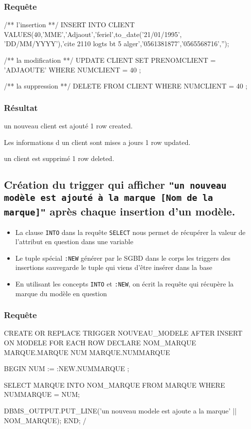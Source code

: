 \documentclass[•]{article}
\begin{document}
\subsubsection{Requête}
\begin{sql}
/** l'insertion **/
INSERT INTO CLIENT 
VALUES(40,'MME','Adjaout','feriel',to_date('21/01/1995', 'DD/MM/YYYY'),'cite 2110 logts bt 5 alger','0561381877','0565568716','');

/** la modification **/
UPDATE CLIENT 
SET PRENOMCLIENT = 'ADJAOUTE' 
WHERE NUMCLIENT = 40 ;

/** la suppression **/
DELETE FROM CLIENT 
WHERE NUMCLIENT = 40 ;

\end{sql}
\subsubsection{Résultat}
\begin{sql}
un nouveau client est ajouté
1 row created.

Les informations d un client sont mises a jours
1 row updated.

un client est supprimé
1 row deleted.
\end{sql}

\subsection{Création du trigger qui afficher \texttt{"un nouveau modèle est ajouté à la marque [Nom de la marque]"}
après chaque insertion d'un modèle.}

\begin{itemize}
\item
La clause \texttt{INTO} dans la requête \texttt{SELECT} nous permet de récupérer la 
valeur de l'attribut en question dans une variable
\item
Le tuple spécial \texttt{:NEW} générer par le SGBD dans le corps les triggers des insertions 
sauvegarde le tuple qui viens d'être insérer dans la base
\item
En utilisant les concepts \texttt{INTO} et \texttt{:NEW}, on écrit la requête qui récupère la marque du modèle en question
\end{itemize}


\subsubsection{Requête}
\begin{sql}
CREATE OR REPLACE TRIGGER NOUVEAU_MODELE
AFTER INSERT ON MODELE
FOR EACH ROW
DECLARE 
NOM_MARQUE MARQUE.MARQUE%
NUM MARQUE.NUMMARQUE%

BEGIN
    NUM := :NEW.NUMMARQUE ;

	SELECT MARQUE INTO NOM_MARQUE
	FROM MARQUE WHERE NUMMARQUE = NUM;


	DBMS_OUTPUT.PUT_LINE('un nouveau modele est ajoute a la marque' || NOM_MARQUE);
END;
/
\end{sql}
\end{document}
